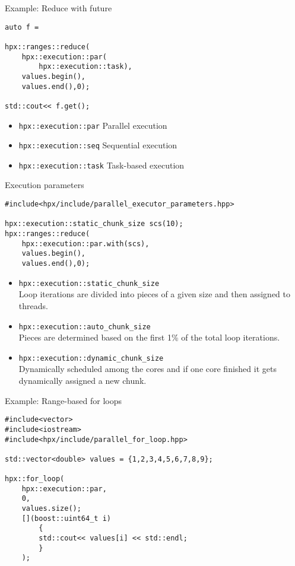 \documentclass[\classoption]{beamer}
\begin{document}
\begin{frame}[fragile]{Example: Reduce with future}


\begin{lstlisting}
auto f =

hpx::ranges::reduce(
	hpx::execution::par(
		hpx::execution::task),
	values.begin(),
	values.end(),0);

std::cout<< f.get();
\end{lstlisting}

\begin{itemize}
\item \lstinline|hpx::execution::par| Parallel execution
\item \lstinline|hpx::execution::seq| Sequential execution
\item \lstinline|hpx::execution::task| Task-based execution
\end{itemize}

\end{frame}


\begin{frame}[fragile]{Execution parameters}


\begin{lstlisting}
#include<hpx/include/parallel_executor_parameters.hpp>

hpx::execution::static_chunk_size scs(10);
hpx::ranges::reduce(
	hpx::execution::par.with(scs),
	values.begin(),
	values.end(),0);
\end{lstlisting}

\begin{itemize}
\item \lstinline|hpx::execution::static_chunk_size| \\
Loop iterations are divided into pieces of a given size and then assigned to threads.
\item \lstinline|hpx::execution::auto_chunk_size| \\
Pieces are determined based on the first 1\% of the total loop iterations. 
\item \lstinline|hpx::execution::dynamic_chunk_size| \\
Dynamically scheduled among the cores and if one core finished it gets dynamically assigned a new chunk.
\end{itemize}

\end{frame}


\begin{frame}[fragile]{Example: Range-based for loops}


\begin{lstlisting}
#include<vector>
#include<iostream>
#include<hpx/include/parallel_for_loop.hpp>

std::vector<double> values = {1,2,3,4,5,6,7,8,9};

hpx::for_loop(
	hpx::execution::par, 
	0, 
	values.size();
	[](boost::uint64_t i)
		{
		std::cout<< values[i] << std::endl;
		}
	);
\end{lstlisting}

\end{frame}
\end{document}
